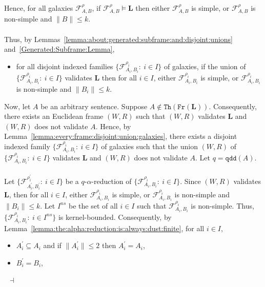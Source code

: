 \documentclass[draft]{article}
\newenvironment{proof}{{\bf Proof:}}{~$\dashv$\\}
\def\qd{\mathtt{qd}}
\def\qdd{\mathtt{qdd}}
\def\Th{\mathtt{Th}}
\def\Fr{\mathtt{Fr}}
\def\L{\mathbf{L}}
\def\qd{\mathtt{qd}}
\begin{document}
\begin{proof}
Hence, for all galaxies ${\mathcal F}_{A,B}^{\rho}$, if ${\mathcal F}_{A,B}^{\rho}{\models}\L$ then either ${\mathcal F}_{A,B}^{\rho}$ is simple, or ${\mathcal F}_{A,B}^{\rho}$ is non-simple and ${\parallel}B{\parallel}{\leq}k$.
%
%
\\
\\
%
%
Thus, by Lemmas~\ref{lemma:about:generated:subframe:and:disjoint:unions} and~\ref{Generated:Subframe:Lemma},
%
%
\begin{itemize}
%
%
\item for all disjoint indexed families $\{{\mathcal F}_{A_{i},B_{i}}^{\rho_{i}}:\ i{\in}I\}$ of galaxies, if the union of $\{{\mathcal F}_{A_{i},B_{i}}^{\rho_{i}}:\ i{\in}I\}$ validates $\L$ then for all $i{\in}I$, either ${\mathcal F}_{A_{i},B_{i}}^{\rho_{i}}$ is simple, or ${\mathcal F}_{A_{i},B_{i}}^{\rho_{i}}$ is non-simple and ${\parallel}B_{i}{\parallel}{\leq}k$.
%
%
\end{itemize}
%
%
Now, let $A$ be an arbitrary sentence.
Suppose $A{\not\in}\Th(\Fr(\L))$.
Consequently, there exists an Euclidean frame $(W,R)$ such that $(W,R)$ validates $\L$ and $(W,R)$ does not validate $A$.
Hence, by Lemma~\ref{lemma:every:frame:disjoint:union:galaxies}, there exists a disjoint indexed family $\{{\mathcal F}_{A_{i},B_{i}}^{\rho_{i}}:\ i{\in}I\}$ of galaxies such that the union $(W,R)$ of $\{{\mathcal F}_{A_{i},B_{i}}^{\rho_{i}}:\ i{\in}I\}$ validates $\L$ and $(W,R)$ does not validate $A$.
Let $q{=}\qdd(A)$.
%
%
\\
\\
%
%
Let $\{{\mathcal F}_{A_{i}^{\prime},B_{i}^{\prime}}^{\rho_{i}^{\prime}}:\ i{\in}I\}$ be a $q$-$\alpha$-reduction of $\{{\mathcal F}_{A_{i},B_{i}}^{\rho_{i}}:\ i{\in}I\}$.
Since $(W,R)$ validates $\L$, then for all $i{\in}I$, either ${\mathcal F}_{A_{i},B_{i}}^{\rho_{i}}$ is simple, or ${\mathcal F}_{A_{i},B_{i}}^{\rho_{i}}$ is non-simple and ${\parallel}B_{i}{\parallel}{\leq}k$.
Let $I^{ns}$ be the set of all $i{\in}I$ such that ${\mathcal F}_{A_{i},B_{i}}^{\rho_{i}}$ is non-simple.
Thus, $\{{\mathcal F}_{A_{i},B_{i}}^{\rho_{i}}:\ i{\in}I^{ns}\}$ is kernel-bounded.
Consequently, by Lemma~\ref{lemma:the:alpha:reduction:is:always:dust:finite}, for all $i{\in}I$,
%
%
\begin{itemize}
%
%
\item $A_{i}^{\prime}{\subseteq}A_{i}$ and if ${\parallel}A_{i}^{\prime}{\parallel}{\leq}2$ then $A_{i}^{\prime}{=}A_{i}$,
%
%
\item $B_{i}^{\prime}{=}B_{i}$,

\end{itemize}
\end{proof}
\end{document}
